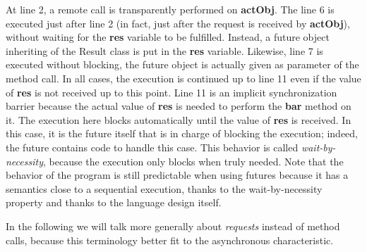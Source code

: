 \documentclass[11pt]{report}
\begin{document}
At line 2, a remote call is transparently performed on \textbf{actObj}. The line 6 is executed just after line 2 (in fact, just after the request is received by \textbf{actObj}), without waiting for the \textbf{res} variable to be fulfilled. Instead, a future object inheriting of the Result class is put in the \textbf{res} variable. Likewise, line 7 is executed without blocking, the future object is actually given as parameter of the method call. In all cases, the execution is continued up to line 11 even if the value of \textbf{res} is not received up to this point. Line 11 is an implicit synchronization barrier because the actual value of \textbf{res} is needed to perform the \textbf{bar} method on it. The execution here blocks automatically until the value of \textbf{res} is received. In this case, it is the future itself that is in charge of blocking the execution; indeed, the future contains code to handle this case. This behavior is called \emph{wait-by-necessity}, because the execution only blocks when truly needed. 
Note that the behavior of the program is still predictable when using futures because it has a semantics close to a sequential execution, thanks to the wait-by-necessity property and thanks to the language design itself. 

In the following we will talk more generally about \emph{requests} instead of method calls, because this terminology better fit to the asynchronous characteristic.
\end{document}
